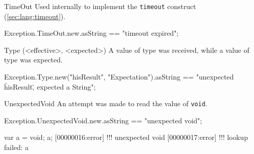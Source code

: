 \begin{urbiscriptapi}
\item[TimeOut]%
  Used internally to implement the \lstinline|timeout| construct
  (\autoref{sec:lang:timeout}).
\begin{urbiassert}
Exception.TimeOut.new.asString
  == "timeout expired";
\end{urbiassert}

\item[Type](<effective>, <expected>)
  A value of type  was received, while a value of type
   was expected.
\begin{urbiassert}
Exception.Type.new("hisResult", "Expectation").asString
  == "unexpected \"hisResult\", expected a String";
\end{urbiassert}

\item[UnexpectedVoid] An attempt was made to read the value of
  \lstinline|void|.
\begin{urbiassert}
Exception.UnexpectedVoid.new.asString
  == "unexpected void";
\end{urbiassert}
\begin{urbiscript}
var a = void;
a;
[00000016:error] !!! unexpected void
[00000017:error] !!! lookup failed: a
\end{urbiscript}
\end{urbiscriptapi}


